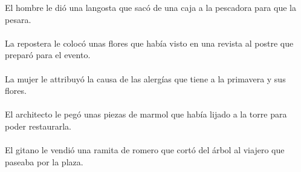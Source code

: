 El hombre le dió una langosta que sacó de una caja a la pescadora para que la pesara.	\\	\\
La repostera le colocó unas flores que había visto en una revista al postre que preparó para el evento.	\\	\\
La mujer le attribuyó la causa de las alergías que tiene a la primavera y sus flores.	\\	\\
El architecto le pegó unas piezas de marmol que había lijado a la torre para poder restaurarla.	\\	\\
El gitano le vendió una ramita de romero que cortó del árbol al viajero que paseaba por la plaza. 
